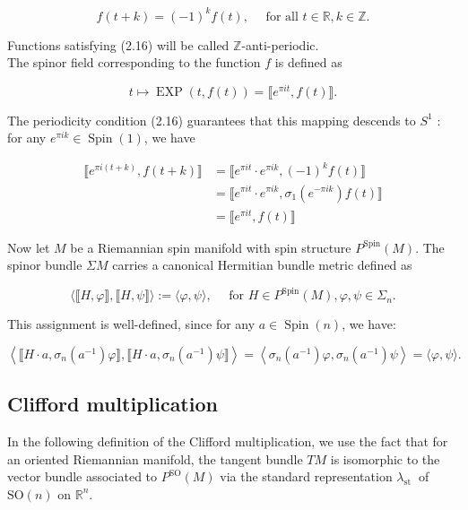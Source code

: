 \documentclass[10pt, letterpaper]{article}
\begin{document}
$$
f(t+k)=(-1)^{k} f(t), \quad \text { for all } t \in \mathbb{R}, k \in \mathbb{Z} .
$$

Functions satisfying (2.16) will be called $\mathbb{Z}$-anti-periodic.\\
The spinor field corresponding to the function $f$ is defined as

$$
t \mapsto \operatorname{EXP}(t, f(t))=\llbracket e^{\pi i t}, f(t) \rrbracket .
$$

The periodicity condition (2.16) guarantees that this mapping descends to $S^{1}$ : for any $e^{\pi i k} \in \operatorname{Spin}(1)$, we have

$$
\begin{aligned}
\llbracket e^{\pi i(t+k)}, f(t+k) \rrbracket & =\llbracket e^{\pi i t} \cdot e^{\pi i k},(-1)^{k} f(t) \rrbracket \\
& =\llbracket e^{\pi i t} \cdot e^{\pi i k}, \sigma_{1}\left(e^{-\pi i k}\right) f(t) \rrbracket \\
& =\llbracket e^{\pi i t}, f(t) \rrbracket
\end{aligned}
$$

Now let $M$ be a Riemannian spin manifold with spin structure $P^{\operatorname{Spin}}(M)$. The spinor bundle $\Sigma M$ carries a canonical Hermitian bundle metric defined as

$$
\langle\llbracket H, \varphi \rrbracket, \llbracket H, \psi \rrbracket\rangle:=\langle\varphi, \psi\rangle, \quad \text { for } H \in P^{\operatorname{Spin}}(M), \varphi, \psi \in \Sigma_{n} .
$$

This assignment is well-defined, since for any $a \in \operatorname{Spin}(n)$, we have:

$$
\left\langle\llbracket H \cdot a, \sigma_{n}\left(a^{-1}\right) \varphi \rrbracket, \llbracket H \cdot a, \sigma_{n}\left(a^{-1}\right) \psi \rrbracket\right\rangle=\left\langle\sigma_{n}\left(a^{-1}\right) \varphi, \sigma_{n}\left(a^{-1}\right) \psi\right\rangle=\langle\varphi, \psi\rangle .
$$


\pagebreak
\subsection{Clifford multiplication}

In the following definition of the Clifford multiplication, we use the fact that for an oriented Riemannian manifold, the tangent bundle $T M$ is isomorphic to the vector bundle associated to $P^{\mathrm{SO}}(M)$ via the standard representation $\lambda_{\text {st }}$ of $\mathrm{SO}(n)$ on $\mathbb{R}^{n}$.
\end{document}
